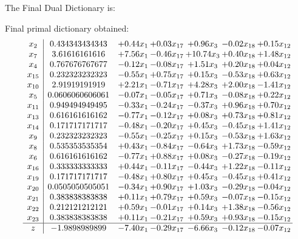 \documentclass[8pt]{article}
\begin{document}
The Final Dual Dictionary is: 

 Final primal dictionary obtained: 
\[\begin{array}{c| c c@{\hskip 2pt} c@{\hskip 2pt} c@{\hskip 2pt} c@{\hskip 2pt} c@{\hskip 2pt} }
 x_{2}   &  0.434343434343 & +  0.44 x_{1} & +  0.03 x_{17} & +  0.96 x_{3} & -0.02 x_{18} & +  0.15 x_{12}\\
 x_{7}   &  3.61616161616 & +  7.56 x_{1} & -0.46 x_{17} & + 10.74 x_{3} & +  0.40 x_{18} & +  1.48 x_{12}\\
 x_{4}   &  0.767676767677 & -0.12 x_{1} & -0.08 x_{17} & +  1.51 x_{3} & +  0.20 x_{18} & +  0.04 x_{12}\\
 x_{15}   &  0.232323232323 & -0.55 x_{1} & +  0.75 x_{17} & +  0.15 x_{3} & -0.53 x_{18} & +  0.63 x_{12}\\
 x_{10}   &  2.91919191919 & +  2.21 x_{1} & -0.71 x_{17} & +  4.28 x_{3} & +  2.00 x_{18} & -1.41 x_{12}\\
 x_{5}   &  0.0606060606061 & -0.07 x_{1} & -0.05 x_{17} & +  0.71 x_{3} & -0.08 x_{18} & +  0.22 x_{12}\\
 x_{11}   &  0.949494949495 & -0.33 x_{1} & -0.24 x_{17} & -0.37 x_{3} & +  0.96 x_{18} & +  0.70 x_{12}\\
 x_{13}   &  0.616161616162 & -0.77 x_{1} & -0.12 x_{17} & +  0.08 x_{3} & +  0.73 x_{18} & +  0.81 x_{12}\\
 x_{14}   &  0.171717171717 & -0.48 x_{1} & -0.20 x_{17} & +  0.45 x_{3} & -0.45 x_{18} & +  1.41 x_{12}\\
 x_{9}   &  0.232323232323 & -0.55 x_{1} & -0.25 x_{17} & +  0.15 x_{3} & -0.53 x_{18} & +  1.63 x_{12}\\
 x_{8}   &  0.535353535354 & +  0.43 x_{1} & -0.84 x_{17} & -0.64 x_{3} & +  1.73 x_{18} & -0.59 x_{12}\\
 x_{6}   &  0.616161616162 & -0.77 x_{1} & +  0.88 x_{17} & +  0.08 x_{3} & -0.27 x_{18} & -0.19 x_{12}\\
 x_{16}   &  0.333333333333 & +  0.44 x_{1} & -0.11 x_{17} & -0.44 x_{3} & +  1.22 x_{18} & -0.11 x_{12}\\
 x_{19}   &  0.171717171717 & -0.48 x_{1} & +  0.80 x_{17} & +  0.45 x_{3} & -0.45 x_{18} & +  0.41 x_{12}\\
 x_{20}   &  0.0505050505051 & -0.34 x_{1} & +  0.90 x_{17} & +  1.03 x_{3} & -0.29 x_{18} & -0.04 x_{12}\\
 x_{21}   &  0.383838383838 & +  0.11 x_{1} & +  0.79 x_{17} & +  0.59 x_{3} & -0.07 x_{18} & -0.15 x_{12}\\
 x_{22}   &  0.212121212121 & +  0.59 x_{1} & -0.01 x_{17} & +  0.14 x_{3} & +  1.38 x_{18} & -0.56 x_{12}\\
 x_{23}   &  0.383838383838 & +  0.11 x_{1} & -0.21 x_{17} & +  0.59 x_{3} & +  0.93 x_{18} & -0.15 x_{12}\\
\hline
z    &  -1.9898989899 & -7.40 x_{1} & -0.29 x_{17} & -6.66 x_{3} & -0.12 x_{18} & -0.07 x_{12}\\
\end{array}\]
\end{document}
